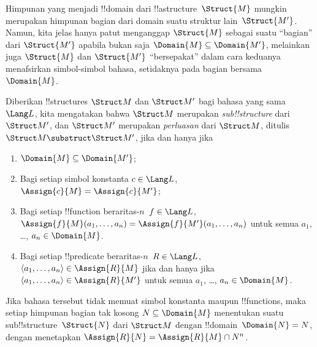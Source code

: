 \documentclass[../../../include/open-logic-section]{subfiles}
\begin{document}

Himpunan yang menjadi !!{domain} dari !!a{structure}~$\Struct{M}$ mungkin
merupakan himpunan bagian dari domain suatu struktur lain~$\Struct{M'}$.
Namun, kita jelas
hanya patut menganggap $\Struct{M}$ sebagai suatu ``bagian'' dari
$\Struct{M'}$ apabila bukan saja $\Domain{M} \subseteq \Domain{M'}$,
melainkan juga $\Struct{M}$ dan $\Struct{M'}$ ``bersepakat'' dalam cara
keduanya menafsirkan simbol-simbol bahasa, setidaknya pada bagian bersama
$\Domain{M}$.

\begin{defn}
Diberikan !!{structure}s $\Struct M$ dan $\Struct M'$ bagi bahasa yang
sama~$\Lang L$, kita mengatakan bahwa $\Struct M$ merupakan
\emph{sub!!{structure}} dari $\Struct M'$, dan $\Struct M'$ merupakan
\emph{perluasan} dari $\Struct M$, ditulis $\Struct M \substruct
\Struct M'$, jika dan hanya jika
\begin{enumerate}
\item $\Domain{M} \subseteq \Domain{M'}$;
\item Bagi setiap simbol konstanta $c \in \Lang L$, $\Assign{c}{M} =
    \Assign{c}{M'}$;
\item Bagi setiap !!{function} beraritas-$n$~$f \in \Lang L$,
  $\Assign{f}{M}(a_1, \dots, a_n) = \Assign{f}{M'}(a_1, \dots, a_n)$
  untuk semua $a_1$, \dots, $a_n \in \Domain{M}$.
\item Bagi setiap !!{predicate} beraritas-$n$~$R \in \Lang L$,
  $\langle a_1, \dots, a_n\rangle \in \Assign{R}{M}$ jika dan hanya
  jika $\langle a_1, \dots, a_n\rangle \in \Assign{R}{M'}$ untuk
  semua $a_1$, \dots, $a_n \in \Domain{M}$.
\end{enumerate}
\end{defn}

\begin{rem}
Jika bahasa tersebut tidak memuat simbol konstanta maupun !!{function}s,
maka setiap himpunan bagian tak kosong $N \subseteq \Domain{M}$ menentukan
suatu sub!!{structure}~$\Struct{N}$ dari $\Struct M$ dengan
!!{domain}~$\Domain{N} = N$, dengan menetapkan $\Assign{R}{N} =
\Assign{R}{M} \cap N^n$.
\end{rem}

\end{document}
